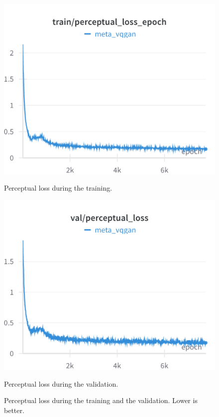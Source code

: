 \begin{figure}[H]
\includegraphics[width=\linewidth]{detailed_engineering/Meta VQGAN/charts/Section-2-Panel-7-jxu137h9u.png}
\caption{Perceptual loss during the training.}
\endminipage\hfill
{}
\includegraphics[width=\linewidth]{detailed_engineering/Meta VQGAN/charts/Section-4-Panel-0-9utd8c9z0.png}
\caption{Perceptual loss during the validation.}
\endminipage
\caption{Perceptual loss during the training and the validation. Lower is better.}
\end{figure}

